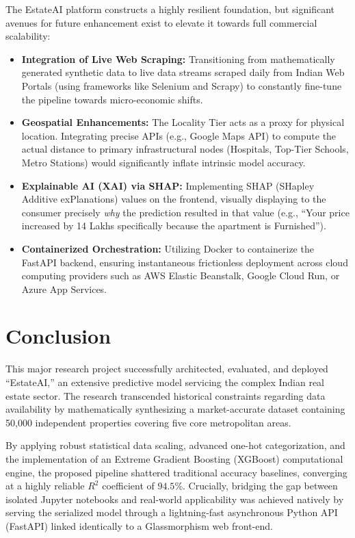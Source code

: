 \documentclass[conference]{IEEEtran}
\begin{document}
The EstateAI platform constructs a highly resilient foundation, but significant avenues for future enhancement exist to elevate it towards full commercial scalability:
\begin{itemize}
    \item \textbf{Integration of Live Web Scraping:} Transitioning from mathematically generated synthetic data to live data streams scraped daily from Indian Web Portals (using frameworks like Selenium and Scrapy) to constantly fine-tune the pipeline towards micro-economic shifts.
    \item \textbf{Geospatial Enhancements:} The Locality Tier acts as a proxy for physical location. Integrating precise APIs (e.g., Google Maps API) to compute the actual distance to primary infrastructural nodes (Hospitals, Top-Tier Schools, Metro Stations) would significantly inflate intrinsic model accuracy.
    \item \textbf{Explainable AI (XAI) via SHAP:} Implementing SHAP (SHapley Additive exPlanations) values on the frontend, visually displaying to the consumer precisely \textit{why} the prediction resulted in that value (e.g., ``Your price increased by 14 Lakhs specifically because the apartment is Furnished'').
    \item \textbf{Containerized Orchestration:} Utilizing Docker to containerize the FastAPI backend, ensuring instantaneous frictionless deployment across cloud computing providers such as AWS Elastic Beanstalk, Google Cloud Run, or Azure App Services.
\end{itemize}

\section{Conclusion}

This major research project successfully architected, evaluated, and deployed ``EstateAI,'' an extensive predictive model servicing the complex Indian real estate sector. The research transcended historical constraints regarding data availability by mathematically synthesizing a market-accurate dataset containing 50,000 independent properties covering five core metropolitan areas. 

By applying robust statistical data scaling, advanced one-hot categorization, and the implementation of an Extreme Gradient Boosting (XGBoost) computational engine, the proposed pipeline shattered traditional accuracy baselines, converging at a highly reliable $R^2$ coefficient of $94.5\%$. Crucially, bridging the gap between isolated Jupyter notebooks and real-world applicability was achieved natively by serving the serialized model through a lightning-fast asynchronous Python API (FastAPI) linked identically to a Glassmorphism web front-end.
\end{document}
